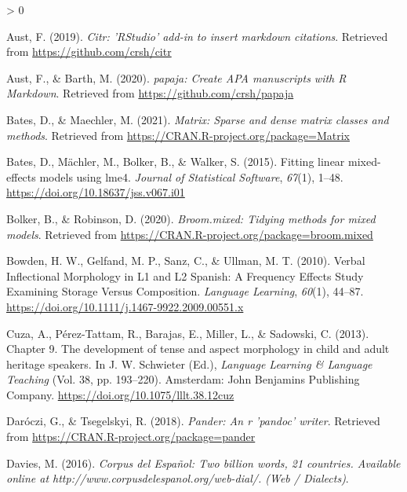 \documentclass[
  english,
  man]{apa6}
\newlength{\cslhangindent}
\newenvironment{CSLReferences}[2] %
 {%
  \setlength{\parindent}{0pt}
  \ifodd #1 \everypar{\setlength{\hangindent}{\cslhangindent}}\ignorespaces\fi
  \ifnum #2 > 0
  \setlength{\parskip}{#2\baselineskip}
  \fi
 }%
 {}
\begin{document}
\hypertarget{refs}{}
\begin{CSLReferences}{1}{0}
\leavevmode\hypertarget{ref-R-citr}{}%
Aust, F. (2019). \emph{Citr: 'RStudio' add-in to insert markdown citations}. Retrieved from \url{https://github.com/crsh/citr}

\leavevmode\hypertarget{ref-R-papaja}{}%
Aust, F., \& Barth, M. (2020). \emph{{papaja}: {Create} {APA} manuscripts with {R Markdown}}. Retrieved from \url{https://github.com/crsh/papaja}

\leavevmode\hypertarget{ref-R-Matrix}{}%
Bates, D., \& Maechler, M. (2021). \emph{Matrix: Sparse and dense matrix classes and methods}. Retrieved from \url{https://CRAN.R-project.org/package=Matrix}

\leavevmode\hypertarget{ref-R-lme4}{}%
Bates, D., Mächler, M., Bolker, B., \& Walker, S. (2015). Fitting linear mixed-effects models using {lme4}. \emph{Journal of Statistical Software}, \emph{67}(1), 1--48. \url{https://doi.org/10.18637/jss.v067.i01}

\leavevmode\hypertarget{ref-R-broom.mixed}{}%
Bolker, B., \& Robinson, D. (2020). \emph{Broom.mixed: Tidying methods for mixed models}. Retrieved from \url{https://CRAN.R-project.org/package=broom.mixed}

\leavevmode\hypertarget{ref-bowden_verbal_2010}{}%
Bowden, H. W., Gelfand, M. P., Sanz, C., \& Ullman, M. T. (2010). Verbal {Inflectional} {Morphology} in {L1} and {L2} {Spanish}: {A} {Frequency} {Effects} {Study} {Examining} {Storage} {Versus} {Composition}. \emph{Language Learning}, \emph{60}(1), 44--87. \url{https://doi.org/10.1111/j.1467-9922.2009.00551.x}

\leavevmode\hypertarget{ref-schwieter_chapter_2013}{}%
Cuza, A., Pérez-Tattam, R., Barajas, E., Miller, L., \& Sadowski, C. (2013). Chapter 9. {The} development of tense and aspect morphology in child and adult heritage speakers. In J. W. Schwieter (Ed.), \emph{Language {Learning} \& {Language} {Teaching}} (Vol. 38, pp. 193--220). Amsterdam: John Benjamins Publishing Company. \url{https://doi.org/10.1075/lllt.38.12cuz}

\leavevmode\hypertarget{ref-R-pander}{}%
Daróczi, G., \& Tsegelskyi, R. (2018). \emph{Pander: An r 'pandoc' writer}. Retrieved from \url{https://CRAN.R-project.org/package=pander}

\leavevmode\hypertarget{ref-davies_corpus_2016}{}%
Davies, M. (2016). \emph{Corpus del {Español}: {Two} billion words, 21 countries. {Available} online at http://www.corpusdelespanol.org/web-dial/. ({Web} / {Dialects})}.


\end{CSLReferences}
\end{document}
